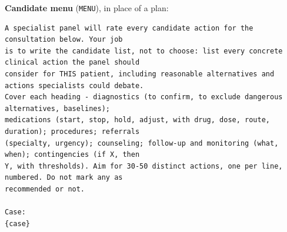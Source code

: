 \documentclass[11pt]{article}
\begin{document}
\textbf{Candidate menu} (\texttt{MENU}), in place of a plan:
\begin{lstlisting}
A specialist panel will rate every candidate action for the consultation below. Your job
is to write the candidate list, not to choose: list every concrete clinical action the panel should
consider for THIS patient, including reasonable alternatives and actions specialists could debate.
Cover each heading - diagnostics (to confirm, to exclude dangerous alternatives, baselines);
medications (start, stop, hold, adjust, with drug, dose, route, duration); procedures; referrals
(specialty, urgency); counseling; follow-up and monitoring (what, when); contingencies (if X, then
Y, with thresholds). Aim for 30-50 distinct actions, one per line, numbered. Do not mark any as
recommended or not.

Case:
{case}
\end{lstlisting}
\end{document}
